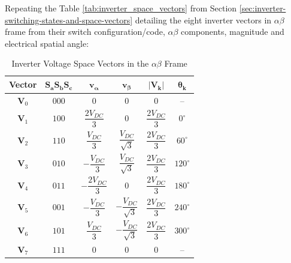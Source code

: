 \documentclass{article}
\begin{document}
Repeating the Table \ref{tab:inverter_space_vectors} from Section \ref{sec:inverter-switching-states-and-space-vectors} detailing the eight inverter vectors in $\alpha\beta$ frame from their switch configuration/code, $\alpha\beta$ components, magnitude and electrical spatial angle:

\begin{table}[H]
    \centering
    \caption{Inverter Voltage Space Vectors in the $\alpha\beta$ Frame}
    \label{tab:inverter_space_vectors2}

    \renewcommand{\arraystretch}{2.3}
    \setlength{\tabcolsep}{12pt}

    \begin{tabular}{c c c c c c}
        \hline
        \textbf{Vector} &
        $\boldsymbol{S_aS_bS_c}$ &
        $\boldsymbol{v_\alpha}$ &
        $\boldsymbol{v_\beta}$ &
        $\boldsymbol{|\mathbf{V}_k|}$ &
        $\boldsymbol{\theta_k}$ \\
        \hline

        $\mathbf{V}_0$ & $000$
        & $0$
        & $0$
        & $0$
        & -- \\

        $\mathbf{V}_1$ & $100$
        & $\dfrac{2V_{DC}}{3}$
        & $0$
        & $\dfrac{2V_{DC}}{3}$
        & $0^\circ$ \\

        $\mathbf{V}_2$ & $110$
        & $\dfrac{V_{DC}}{3}$
        & $\dfrac{V_{DC}}{\sqrt{3}}$
        & $\dfrac{2V_{DC}}{3}$
        & $60^\circ$ \\

        $\mathbf{V}_3$ & $010$
        & $-\dfrac{V_{DC}}{3}$
        & $\dfrac{V_{DC}}{\sqrt{3}}$
        & $\dfrac{2V_{DC}}{3}$
        & $120^\circ$ \\

        $\mathbf{V}_4$ & $011$
        & $-\dfrac{2V_{DC}}{3}$
        & $0$
        & $\dfrac{2V_{DC}}{3}$
        & $180^\circ$ \\

        $\mathbf{V}_5$ & $001$
        & $-\dfrac{V_{DC}}{3}$
        & $-\dfrac{V_{DC}}{\sqrt{3}}$
        & $\dfrac{2V_{DC}}{3}$
        & $240^\circ$ \\

        $\mathbf{V}_6$ & $101$
        & $\dfrac{V_{DC}}{3}$
        & $-\dfrac{V_{DC}}{\sqrt{3}}$
        & $\dfrac{2V_{DC}}{3}$
        & $300^\circ$ \\

        $\mathbf{V}_7$ & $111$
        & $0$
        & $0$
        & $0$
        & -- \\

        \hline
    \end{tabular}
\end{table}
\end{document}

